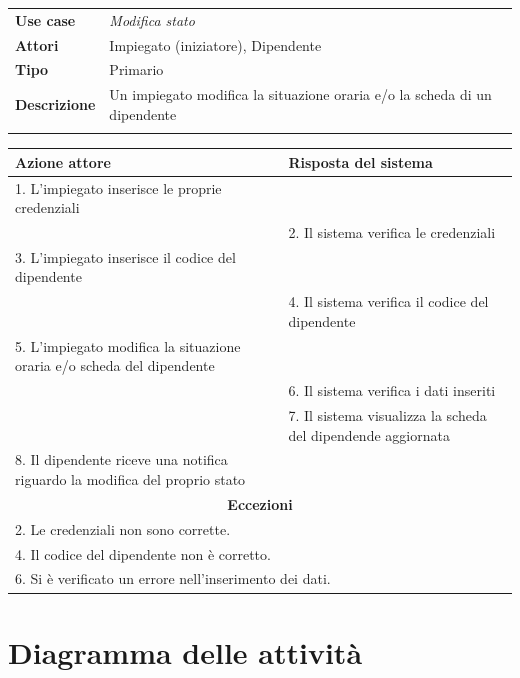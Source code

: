 \documentclass{scrreprt}
\begin{document}
	\FloatBarrier
	\begin{table}[h|]
	\centering
	\begin{tabular}{p{3cm}p{11cm}}
	\textbf{Use case} & \textit{Modifica stato} \\ 
	\textbf{Attori} & Impiegato (iniziatore), Dipendente \\ 
	\textbf{Tipo} & Primario \\ 
	\textbf{Descrizione} & Un impiegato modifica la situazione oraria e/o la scheda di un dipendente \\
	\\
	\end{tabular}
	\centering
	\begin{tabular}{|p{7cm}|p{7cm}|}
	\hline
	\textbf{Azione attore} & \textbf{Risposta del sistema} \\ \hline
	1. L'impiegato inserisce le proprie credenziali &                  \\ \hline
	& 2. Il sistema verifica le credenziali                  \\ \hline
	3. L'impiegato inserisce il codice del dipendente & \\ \hline
	& 4. Il sistema verifica il codice del dipendente                  \\ \hline
		5. L'impiegato modifica la situazione oraria e/o scheda del dipendente &                  \\ \hline
		& 6. Il sistema verifica i dati inseriti                  \\ \hline
	& 7. Il sistema visualizza la scheda del dipendende aggiornata                  \\ \hline
		8. Il dipendente riceve una notifica riguardo la modifica del proprio stato &                  \\ \hline
	\multicolumn{2}{|c|}{\textbf{Eccezioni}} \\ \hline
	\multicolumn{2}{|l|}{ 2. Le credenziali non sono corrette.} \\ \hline
		\multicolumn{2}{|l|}{ 4. Il codice del dipendente non è corretto.} \\ \hline
		\multicolumn{2}{|l|}{ 6. Si è verificato un errore nell'inserimento dei dati.} \\ \hline
	\end{tabular}
	\end{table}
	\FloatBarrier
	

\FloatBarrier
\section{Diagramma delle attività}
\end{document}

